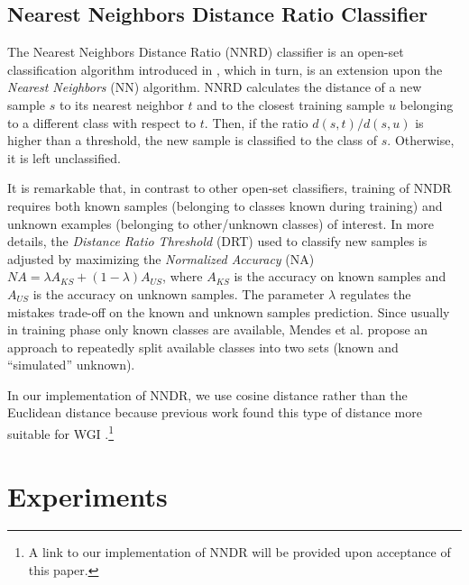\documentclass[runningheads]{llncs}
\begin{document}
\subsection{Nearest Neighbors Distance Ratio Classifier}\label{sec:NNRD_Description}

The Nearest Neighbors Distance Ratio (NNRD) classifier is an open-set classification algorithm introduced in \cite{mendesjunior2016}, which in turn, is an extension upon the \textit{Nearest Neighbors} (NN) algorithm. NNRD calculates the distance of a new sample $s$ to its nearest neighbor $t$ and to the closest training sample $u$ belonging to a different class with respect to $t$. Then, if the ratio $d(s,t)/d(s,u)$ is higher than a threshold, the new sample is classified to the class of $s$. Otherwise, it is left unclassified. 

It is remarkable that, in contrast to other open-set classifiers, training of NNDR requires both known samples (belonging to classes known during training) and unknown examples (belonging to other/unknown classes) of interest. In more details, the \textit{Distance Ratio Threshold} (DRT) used to classify new samples is adjusted by maximizing the \textit{Normalized Accuracy} (NA)  $NA = \lambda A_{KS} + (1 - \lambda) A_{US}$, where $A_{KS}$ is the accuracy on known samples and $A_{US}$ is the accuracy on unknown samples. The parameter $\lambda$ regulates the mistakes trade-off on the known and unknown samples prediction. Since usually in training phase only known classes are available, Mendes et al. \cite{mendesjunior2016} propose an approach to repeatedly split available classes into two sets (known and ``simulated'' unknown). 

In our implementation of NNDR, we use cosine distance rather than the Euclidean distance because previous work found this type of distance more suitable for WGI \cite{pritsos2018open}.\footnote{A link to our implementation of NNDR will be provided upon acceptance of this paper.}

\section{Experiments}\label{sec:experiments}
\end{document}
